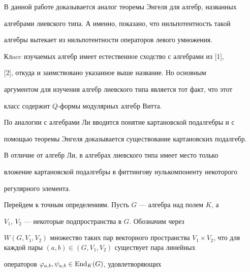 

\maketitle 


\label{begin} 


 


 


 


В данной работе доказывается аналог теоремы Энгеля для алгебр, названных 


алгебрами лиевского типа. А именно, показано, что нильпотентность такой 


алгебры вытекает из нильпотентности операторов левого умножения.  


 


Клacc изучаемых алгебр имеет естественное сходство с алгебрами из [1], 


[2], откуда и заимствовано указанное выше название. Но основным 


аргументом для изучения алгебр лиевского типа является тот факт, что этот 


класс содержит $Q$-формы модулярных алгебр Витта.  


 


По аналогии с алгебрами Ли вводится понятие картановской подалгебры и с 


помощью теоремы Энгеля доказывается существование картановских подалгебр. 


В отличие от алгебр Ли, в алгебрах лиевского типа имеет место только 


вложение картановской подалгебры в фиттингову нулькомпоненту некоторого 


регулярного элемента.  


 


Перейдем к точным определениям. Пусть $G$ --- алгебра над полем $K$, а 


$V_1$, $V_2$ --- некоторые подпространства в $G$. Обозначим через 


$W(G,V_1,V_2)$ множество таких пар векторного пространства $V_1\times 


V_2$, что для каждой пары $(a,b)\in (G,V_1,V_2)$ существует пара линейных 


операторов $\varphi_{a,b},\psi_{a,b}\in\operatorname{End}_K(G)$, удовлетворяющих 


